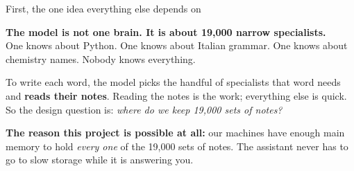 \documentclass[aspectratio=169]{beamer}
\newcommand{\keybox}[1]{%
  \begin{center}
  \colorbox{black!8}{\parbox{0.92\textwidth}{\centering #1}}
  \end{center}}
\newcommand{\goodbox}[1]{%
  \begin{center}
  \colorbox{green!12}{\parbox{0.92\textwidth}{\centering #1}}
  \end{center}}
\begin{document}
\begin{frame}{First, the one idea everything else depends on}

\keybox{\textbf{The model is not one brain. It is about 19,000 narrow specialists.}\\[0.3em]
One knows about Python. One knows about Italian grammar. One knows about chemistry names. Nobody
knows everything.}

\vspace{0.5em}
{\small To write each word, the model picks the handful of specialists that word needs and
\textbf{reads their notes}. Reading the notes is the work; everything else is quick. So the design
question is: \emph{where do we keep 19,000 sets of notes?}}

\begin{center}
\end{center}

\vspace{0.4em}
\goodbox{\small \textbf{The reason this project is possible at all:} our machines have enough main
memory to hold \emph{every one} of the 19,000 sets of notes. The assistant never has to go to slow
storage while it is answering you.}

\end{frame}
\end{document}
